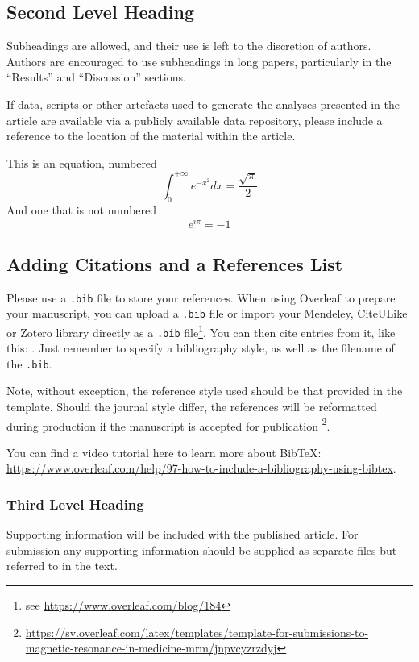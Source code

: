 \documentclass[num-refs]{wiley-article}
\begin{document}
\subsection{Second Level Heading}
Subheadings are allowed, and their use is left to the discretion of authors. 
Authors are encouraged to use subheadings in long papers, particularly in the “Results” and “Discussion” sections. 

If data, scripts or other artefacts used to generate the analyses presented in the article are available via a publicly available data repository, please include a reference to the location of the material within the article.

This is an equation, numbered
\begin{equation}
\int_0^{+\infty}e^{-x^2}dx=\frac{\sqrt{\pi}}{2}
\end{equation}
And one that is not numbered
\begin{equation*}
e^{i\pi}=-1
\end{equation*}

\subsection{Adding Citations and a References List}

Please use a \verb|.bib| file to store your references. 
When using Overleaf to prepare your manuscript, you can upload a \verb|.bib| file or import your Mendeley, CiteULike or Zotero library directly as a \verb|.bib| file\footnote{see \url{https://www.overleaf.com/blog/184}}. 
You can then cite entries from it, like this: \cite{lees2010theoretical}. 
Just remember to specify a bibliography style, as well as the filename of the \verb|.bib|.

Note, without exception, the reference style used should be that provided in the template. 
Should the journal style differ, the references will be reformatted during production if the manuscript is accepted for publication \footnote{\url{https://sv.overleaf.com/latex/templates/template-for-submissions-to-magnetic-resonance-in-medicine-mrm/jnpvcyzrzdyj}}.

You can find a video tutorial here to learn more about BibTeX: \url{https://www.overleaf.com/help/97-how-to-include-a-bibliography-using-bibtex}.

\subsubsection{Third Level Heading}
Supporting information will be included with the published article. 
For submission any supporting information should be supplied as separate files but referred to in the text.
\end{document}
